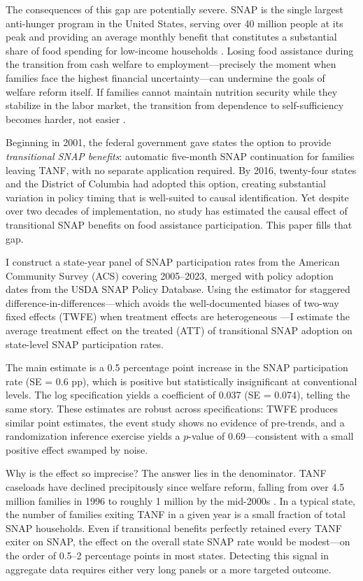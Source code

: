 \documentclass[12pt]{article}
\begin{document}
The consequences of this gap are potentially severe. SNAP is the single largest anti-hunger program in the United States, serving over 40 million people at its peak and providing an average monthly benefit that constitutes a substantial share of food spending for low-income households \citep{hoynes2016snap, ganong2018consumer}. Losing food assistance during the transition from cash welfare to employment---precisely the moment when families face the highest financial uncertainty---can undermine the goals of welfare reform itself. If families cannot maintain nutrition security while they stabilize in the labor market, the transition from dependence to self-sufficiency becomes harder, not easier \citep{bitler2017child, east2018snap}.

Beginning in 2001, the federal government gave states the option to provide \emph{transitional SNAP benefits}: automatic five-month SNAP continuation for families leaving TANF, with no separate application required. By 2016, twenty-four states and the District of Columbia had adopted this option, creating substantial variation in policy timing that is well-suited to causal identification. Yet despite over two decades of implementation, no study has estimated the causal effect of transitional SNAP benefits on food assistance participation. This paper fills that gap.

I construct a state-year panel of SNAP participation rates from the American Community Survey (ACS) covering 2005--2023, merged with policy adoption dates from the USDA SNAP Policy Database. Using the \citet{callaway2021difference} estimator for staggered difference-in-differences---which avoids the well-documented biases of two-way fixed effects (TWFE) when treatment effects are heterogeneous \citep{goodman2021difference, sun2021estimating, roth2023s}---I estimate the average treatment effect on the treated (ATT) of transitional SNAP adoption on state-level SNAP participation rates.

The main estimate is a 0.5 percentage point increase in the SNAP participation rate (SE = 0.6 pp), which is positive but statistically insignificant at conventional levels. The log specification yields a coefficient of 0.037 (SE = 0.074), telling the same story. These estimates are robust across specifications: TWFE produces similar point estimates, the event study shows no evidence of pre-trends, and a randomization inference exercise yields a $p$-value of 0.69---consistent with a small positive effect swamped by noise.

Why is the effect so imprecise? The answer lies in the denominator. TANF caseloads have declined precipitously since welfare reform, falling from over 4.5 million families in 1996 to roughly 1 million by the mid-2000s \citep{falk2022tanf}. In a typical state, the number of families exiting TANF in a given year is a small fraction of total SNAP households. Even if transitional benefits perfectly retained every TANF exiter on SNAP, the effect on the overall state SNAP rate would be modest---on the order of 0.5--2 percentage points in most states. Detecting this signal in aggregate data requires either very long panels or a more targeted outcome.
\end{document}
